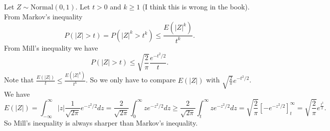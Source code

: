Let $Z \sim \mathrm{Normal}(0, 1)$.
Let $t > 0$ and $k \geq 1$ (I think this is wrong in the book).
From Markov's inequality
\begin{equation*}
    P(|Z| > t) = P(|Z|^k > t^k)
        \leq \frac{E(|Z|^k)}{t^k}.
\end{equation*}
From Mill's inequality we have
\begin{equation*}
    P(|Z| > t) \leq \sqrt{\frac{2}{\pi}} \frac{e^{-t^2/2}}{t}.
\end{equation*}
Note that $\frac{E(|Z|)}{t} \leq \frac{E(|Z|^k)}{t^k}$.
So we only have to compare $E(|Z|)$ with $\sqrt{\frac{2}{\pi}} e^{-t^2/2}$.
We have
\begin{equation*}
    E(|Z|) = \int_{-\infty}^{\infty} |z| \frac{1}{\sqrt{2\pi}} e^{-z^2/2} dz
        = \frac{2}{\sqrt{2\pi}} \int_0^{\infty} z e^{-z^2/2} dz
        \geq \frac{2}{\sqrt{2\pi}} \int_t^{\infty} z e^{-z^2/2} dz
        = \sqrt{\frac{2}{\pi}} \left[ -e^{-z^2/2} \right]_{t}^{\infty}
        = \sqrt{\frac{2}{\pi}} e^{\frac{t^2}{2}}.
\end{equation*}
So Mill's inequality is always sharper than Markov's inequality.
